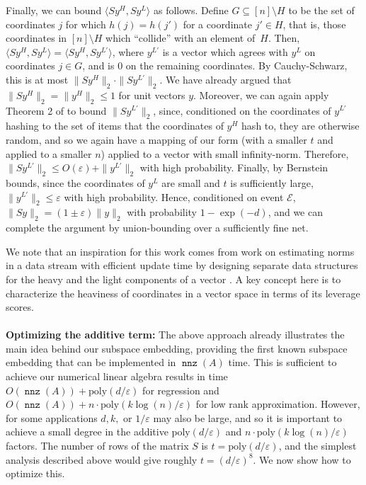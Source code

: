 \documentclass{sig-alternate}
\newcommand{\cE}{\mathcal{E}}
\DeclareMathOperator{\nnz}{\mathtt{nnz}}
\newcommand{\poly}{{\mathrm{poly}}}
\newcommand{\eps}{\varepsilon}
\begin{document}
Finally, we can bound
$\langle Sy^H, Sy^L \rangle$ as follows. Define $G \subseteq [n] \setminus H$ to be the set of coordinates $j$ for
which $h(j) = h(j')$ for a coordinate $j' \in H$, that is, those coordinates in $[n] \setminus H$ which ``collide'' with an element of~$H$.
Then, $\langle Sy^H, Sy^L \rangle = \langle Sy^H, Sy^{L'} \rangle$, where $y^{L'}$ is a vector which agrees with $y^L$ on coordinates
$j \in G$, and is $0$ on the remaining coordinates. By Cauchy-Schwarz, this is at most $\|Sy^H\|_2 \cdot \|Sy^{L'}\|_2$.
We have already argued that $\|Sy^H\|_2 = \|y^H\|_2 \leq 1$ for unit vectors $y$. Moreover, we can again apply Theorem 2 of \cite{dks10}
to bound $\|Sy^{L'}\|_2$, since, conditioned on the coordinates of $y^{L'}$ hashing to the set of items that the coordinates of $y^H$ hash to, they
are otherwise random, and so we again have a mapping of our form (with a smaller $t$ and applied to a smaller $n$) applied to a vector
with small infinity-norm. Therefore, $\|Sy^{L'}\|_2 \leq O(\eps) + \|y^{L'}\|_2$ with high probability. Finally, by Bernstein bounds, since the
coordinates of $y^L$ are small and $t$ is sufficiently large, $\|y^{L'}\|_2 \leq \eps$ with high probability. Hence, conditioned on event $\cE$,
$\|Sy\|_2 = (1 \pm \eps)\|y\|_2$ with probability $1-\exp(-d)$, and we can complete the argument by union-bounding over a sufficiently
fine net. 

We note that an inspiration for this work comes from work on estimating norms in a data stream with efficient update time 
by designing separate data structures for the heavy and the light components of a vector \cite{nw10,knpw11}. A key concept here is to
characterize the heaviness of coordinates in a vector space in terms of its leverage scores. 
\\\\
{\bf Optimizing the additive term:}
The above approach already illustrates the main idea behind our subspace embedding, providing the first known subspace
embedding that can be implemented in $\nnz(A)$ time. This is sufficient
to achieve our numerical linear algebra results in time $O(\nnz(A)) + \poly(d/\eps)$
for regression and $O(\nnz(A)) + n \cdot \poly(k\log(n)/\eps)$ for low rank approximation. However, 
for some applications $d, k,$ or $1/\eps$ may also be large, 
and so it is important to achieve a small degree 
in the additive $\poly(d/\eps)$ and $n \cdot \poly(k\log(n)/\eps)$ factors. 
The number of rows of the matrix $S$ is $t = \poly(d/\eps)$,
and the simplest analysis described above would give roughly 
$t = (d/\eps)^8$. We now show how to optimize this.
\end{document}
